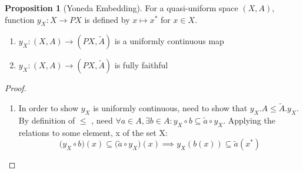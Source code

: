 \documentclass[18pt,a4paper]{article}
\theoremstyle{definition}
\newtheorem{proop}{Proposition}[section]
\begin{document}
\begin{proop}[Yoneda Embedding]
\item For a quasi-uniform space $(X,A)$, function $y_X:X \to PX$ is defined by $x\mapsto x^*$ for $x \in X$.
	\begin{enumerate}[label=(\alph*)]
		\item $y_X:(X,A) \rightarrow (PX,\tilde{A})$ is a uniformly continuous map
		\item $y_X:(X,A) \rightarrow (PX,\tilde{A})$ is fully faithful
	\end{enumerate}
\end{proop}
\begin{proof}
\item \begin{enumerate}[label=(\alph*)]
	\item In order to show $y_X$ is uniformly continuous, need to show that $y_X.A \leq \tilde{A}.y_X $.
		By definition of $\leq$ , need $\forall a\in A, \exists b \in A:
		y_X \circ b \subseteq \tilde{a} \circ y_X $. Applying the relations
		to some element, x of the set X:
		\begin{equation} \big(y_X \circ b\big)(x) \subseteq \big( \tilde{a} \circ y_X\big)(x) \implies
		y_X(b(x)) \subseteq \tilde{a}(x^*) \end{equation}


\end{enumerate}
\end{proof}
\end{document}
